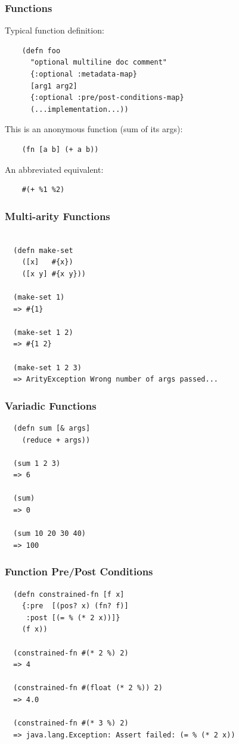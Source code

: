 \documentclass{beamer}
\begin{document}
\begin{frame}[fragile]
  \frametitle{Functions}
  Typical function definition:
  \begin{verbatim}
    (defn foo 
      "optional multiline doc comment"
      {:optional :metadata-map} 
      [arg1 arg2]
      {:optional :pre/post-conditions-map}
      (...implementation...))
  \end{verbatim}

  \vspace{1 cm}


  This is an anonymous function (sum of its args):
  \begin{verbatim}
    (fn [a b] (+ a b))   
  \end{verbatim}
  \vspace{1 cm}

  An abbreviated equivalent:
  \begin{verbatim}
    #(+ %1 %2)
  \end{verbatim}
\end{frame}

\begin{frame}[fragile]
  \frametitle{Multi-arity Functions}
  \begin{verbatim}
  
  (defn make-set 
    ([x]   #{x}) 
    ([x y] #{x y}))

  (make-set 1)
  => #{1}

  (make-set 1 2)
  => #{1 2}
  
  (make-set 1 2 3)
  => ArityException Wrong number of args passed...
\end{verbatim}
\end{frame}

\begin{frame}[fragile]
  \frametitle{Variadic Functions}
  \begin{verbatim}
  (defn sum [& args]
    (reduce + args))

  (sum 1 2 3)
  => 6

  (sum)
  => 0

  (sum 10 20 30 40)
  => 100
  \end{verbatim}
\end{frame}

\begin{frame}[fragile]
  \frametitle{Function Pre/Post Conditions}
  \begin{verbatim}
  (defn constrained-fn [f x]
    {:pre  [(pos? x) (fn? f)]
     :post [(= % (* 2 x))]}
    (f x))

  (constrained-fn #(* 2 %) 2)
  => 4

  (constrained-fn #(float (* 2 %)) 2)
  => 4.0

  (constrained-fn #(* 3 %) 2)
  => java.lang.Exception: Assert failed: (= % (* 2 x))
  \end{verbatim}
\end{frame}
\end{document}
